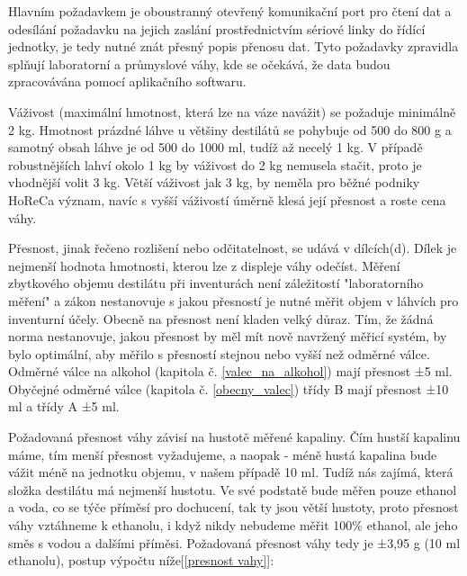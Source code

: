 

Hlavním požadavkem je oboustranný otevřený komunikační port pro čtení dat a odesílání požadavku na jejich zaslání prostřednictvím sériové linky do řídící jednotky, je tedy nutné znát přesný popis přenosu dat. Tyto požadavky zpravidla splňují laboratorní a průmyslové váhy, kde se očekává, že data budou zpracovávána pomocí aplikačního softwaru.

Váživost (maximální hmotnost, která lze na váze navážit) se požaduje minimálně 2 kg. Hmotnost prázdné láhve u většiny destilátů se pohybuje od 500 do 800 g a samotný obsah láhve je od 500 do 1000 ml, tudíž až necelý 1 kg. V případě robustnějších lahví okolo 1 kg by váživost do 2 kg nemusela stačit, proto je vhodnější volit 3 kg. Větší váživost jak 3 kg, by neměla pro běžné podniky HoReCa význam, navíc s vyšší váživostí úměrně klesá její přesnost a roste cena váhy.

Přesnost, jinak řečeno rozlišení nebo odčitatelnost, se udává v dílcích(d). Dílek je nejmenší hodnota hmotnosti, kterou lze z displeje váhy odečíst.\cite{vazivost} Měření zbytkového objemu destilátu při inventurách není záležitostí "laboratorního měření" a zákon nestanovuje s jakou přesností je nutné měřit objem v láhvích pro inventurní účely. Obecně na 
přesnost není kladen velký důraz. Tím, že žádná norma nestanovuje, jakou přesnost by měl mít nově navržený měřicí systém, by bylo optimální, aby měřilo s přesností stejnou nebo vyšší než odměrné válce. Odměrné válce na alkohol
(kapitola č. \ref{valec_na_alkohol}) mají přesnost ±5 ml. Obyčejné odměrné válce (kapitola č. \ref{obecny_valec}) třídy B mají přesnost ±10 ml a třídy A ±5 ml.

Požadovaná přesnost váhy závisí na hustotě měřené kapaliny.  Čím hustší kapalinu máme, tím menší přesnost vyžadujeme, a naopak - méně hustá kapalina bude vážit méně na jednotku objemu, v našem případě 10 ml. Tudíž nás zajímá, která složka destilátu má nejmenší hustotu. Ve své podstatě bude měřen pouze ethanol a voda, co se týče příměsí pro dochucení, tak ty jsou větší hustoty, proto přesnost váhy vztáhneme k ethanolu, i když nikdy nebudeme měřit 100\% ethanol, ale jeho směs s vodou a dalšími příměsi. Požadovaná přesnost váhy tedy je ±3,95 g (10 ml ethanolu), postup výpočtu níže[\ref{presnost vahy}]:\\

